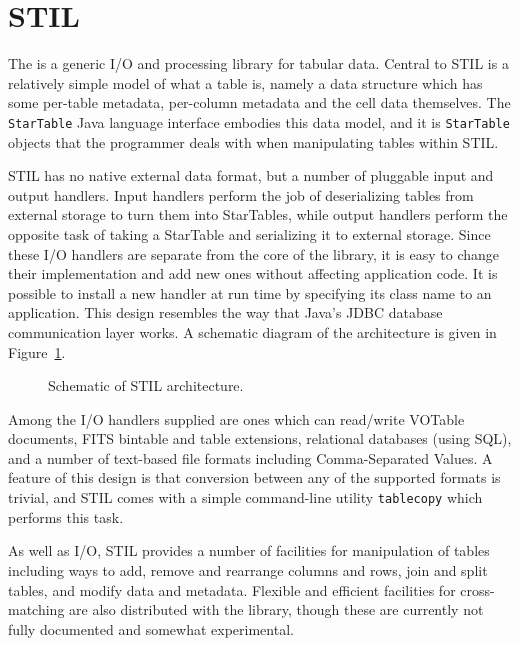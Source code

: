 \documentclass[11pt,twoside]{article}  %
\begin{document}
\section{STIL}

The  
is a generic I/O
and processing library for tabular data.
Central to STIL is a relatively simple model of what a table is, namely
a data structure which has some per-table metadata, per-column metadata
and the cell data themselves.
The {\tt StarTable} Java language interface embodies this data model,
and it is {\tt StarTable} objects that the programmer deals with
when manipulating tables within STIL.

STIL has no native external data format, but a number of pluggable
input and output handlers.  Input handlers perform the job of 
deserializing tables from external storage to turn them into StarTables, 
while output handlers perform the opposite task of taking
a StarTable and serializing it to external storage.
Since these I/O handlers are separate from the core of the library,
it is easy to change their implementation and add new ones 
without affecting application code.
It is possible to install a new handler at run time by specifying its
class name to an application.
This design
resembles the way that Java's JDBC database communication layer works.
A schematic diagram of the architecture is given in 
Figure~\ref{FM-3-fig-stilarch}.
\begin{figure}
\caption{Schematic of STIL architecture.} 
\label{FM-3-fig-stilarch}
\end{figure}

Among the I/O handlers supplied are ones which can read/write 
VOTable documents, 
FITS {\sc bintable} and {\sc table} extensions, 
relational databases (using SQL), 
and a number of text-based file formats including Comma-Separated Values.
A feature of this design is that conversion between any of the
supported formats is trivial, and STIL comes with a simple
command-line utility {\tt tablecopy} which performs this task.

As well as I/O, STIL provides a number of facilities for manipulation 
of tables including ways to add, remove and rearrange columns and rows,
join and split tables, and modify data and metadata.
Flexible and efficient facilities for cross-matching are also distributed
with the library, though these are currently not fully documented
and somewhat experimental.
\end{document}
